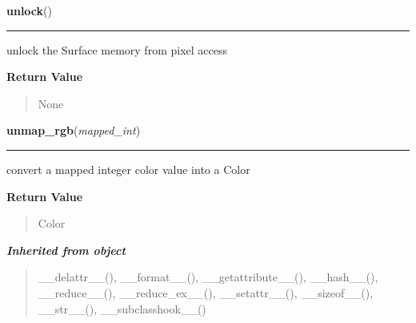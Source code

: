     \label{pygame:Surface:unlock}

    \vspace{0.5ex}

\hspace{.8\funcindent}\begin{boxedminipage}{\funcwidth}

    \raggedright \textbf{unlock}()

    \vspace{-1.5ex}

    \rule{\textwidth}{0.5\fboxrule}
\setlength{\parskip}{2ex}
    unlock the Surface memory from pixel access

\setlength{\parskip}{1ex}
      \textbf{Return Value}
    \vspace{-1ex}

      \begin{quote}
      None

      \end{quote}

    \end{boxedminipage}

    \label{pygame:Surface:unmap_rgb}

    \vspace{0.5ex}

\hspace{.8\funcindent}\begin{boxedminipage}{\funcwidth}

    \raggedright \textbf{unmap\_rgb}(\textit{mapped\_int})

    \vspace{-1.5ex}

    \rule{\textwidth}{0.5\fboxrule}
\setlength{\parskip}{2ex}
    convert a mapped integer color value into a Color

\setlength{\parskip}{1ex}
      \textbf{Return Value}
    \vspace{-1ex}

      \begin{quote}
      Color

      \end{quote}

    \end{boxedminipage}


\large{\textbf{\textit{Inherited from object}}}

\begin{quote}
\_\_delattr\_\_(), \_\_format\_\_(), \_\_getattribute\_\_(), \_\_hash\_\_(), \_\_reduce\_\_(), \_\_reduce\_ex\_\_(), \_\_setattr\_\_(), \_\_sizeof\_\_(), \_\_str\_\_(), \_\_subclasshook\_\_()
\end{quote}

